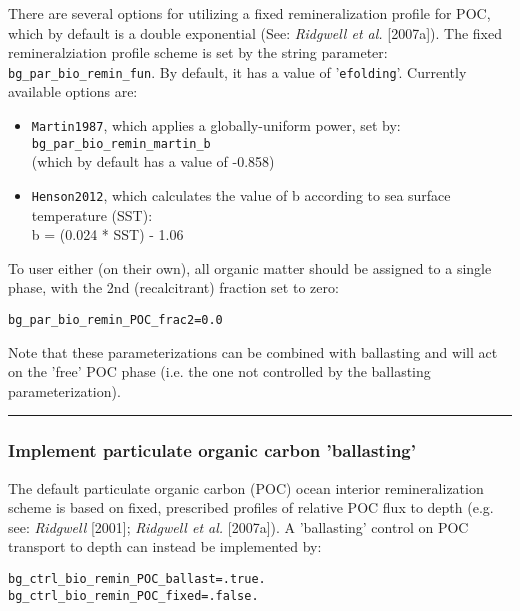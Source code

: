 There are several options for utilizing a fixed remineralization profile for POC, which by default is a double exponential (See: \textit{Ridgwell et al.} [2007a]).
The fixed remineralziation profile scheme is set by the string parameter: \texttt{bg\_par\_bio\_remin\_fun}. By default, it has a value of '\texttt{efolding}'. Currently available options are:

\begin{itemize}[noitemsep]

\vspace{1mm}
\item \texttt{Martin1987}, which applies a globally-uniform power, set by:
  \\ \texttt{bg\_par\_bio\_remin\_martin\_b}
  \\(which by default has a value of -0.858)

\vspace{1mm}
\item \texttt{Henson2012}, which calculates the value of b according to sea surface temperature (SST):
  \\b = (0.024 * SST) - 1.06

\end{itemize}

To user either (on their own), all organic matter should be assigned to a single phase, with the 2nd (recalcitrant) fraction set to zero:
\vspace{-2pt}\begin{verbatim}
bg_par_bio_remin_POC_frac2=0.0
\end{verbatim}\vspace{-2pt}

Note that these parameterizations can be combined with ballasting and will act on the 'free' POC phase (i.e. the one not controlled by the ballasting parameterization).

%
\noindent\rule{4cm}{0.5pt}
\subsubsection{Implement particulate organic carbon 'ballasting'}
\vspace{1mm}

The default particulate organic carbon (POC) ocean interior remineralization scheme is based on fixed, prescribed profiles of relative POC flux to depth (e.g. see: \textit{Ridgwell} [2001]; \textit{Ridgwell et al.} [2007a]). A 'ballasting' control on POC transport to depth can instead be implemented by:
\vspace{-2pt}\begin{verbatim}
bg_ctrl_bio_remin_POC_ballast=.true.
bg_ctrl_bio_remin_POC_fixed=.false.
\end{verbatim}\vspace{-2pt}

